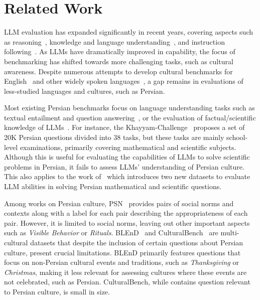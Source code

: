 \section{Related Work}
LLM evaluation has expanded significantly in recent years, covering aspects such as reasoning~\cite{llm_bench_1_rm, llm_bench_4_rm}, knowledge and language understanding~\cite{llm_bench_3_k, llm_bench_5_k}, and instruction following~\cite{llm_bench_0_if, llm_bench_6_if}. As LLMs have dramatically improved in capability, the focus of benchmarking has shifted towards more challenging tasks, such as cultural awareness. Despite numerous attempts to develop cultural benchmarks for English~\cite{cultural_en_1_2024, cultural_en_2_2024, cultural_en_4_2024, cultural_en_5_2024} and other widely spoken languages~\cite{blend_2024, cultural_us_egypt_2024, cultural_multi_1_2024, cultural_korean_2024, acegpt_2024, cultural_en_3_2023}, a gap remains in evaluations of less-studied languages and cultures, such as Persian.

Most existing Persian benchmarks focus on language understanding tasks such as textual entailment and question answering~\cite{farstail_2023, pquad_2023, parsquad_2021, parsinlu_2021}, or the evaluation of factual/scientific knowledge of LLMs~\cite{khayyam_2024, persian_bench_2024}. 
For instance, the Khayyam-Challenge~\cite{khayyam_2024} proposes a set of 20K Persian questions divided into 38 tasks, but these tasks are mainly school-level examinations, primarily covering mathematical and scientific subjects. Although this is useful for evaluating the capabilities of LLMs to solve scientific problems in Persian, it fails to assess LLMs' understanding of Persian culture. This also applies to the work of~\cite{persian_bench_2024} which introduces two new datasets to evaluate LLM abilities in solving Persian mathematical and scientific questions.

Among works on Persian culture, PSN~\cite{psn_2024} provides pairs of social norms and contexts along with a label for each pair describing the appropriateness of each pair. However, it is limited to social norms, leaving out other important aspects such as \textit{Visible Behavior} or \textit{Rituals}. BLEnD~\cite{blend_2024} and CulturalBench~\cite{cultural_en_5_2024} are multi-cultural datasets that despite the inclusion of certain questions about Persian culture, present crucial limitations. BLEnD primarily features questions that focus on non-Persian cultural events and traditions, such as {\it Thanksgiving} or {\it Christmas}, making it less relevant for assessing cultures where these events are not celebrated, such as Persian. CulturalBench, while contains question relevant to Persian culture, is small in size.


